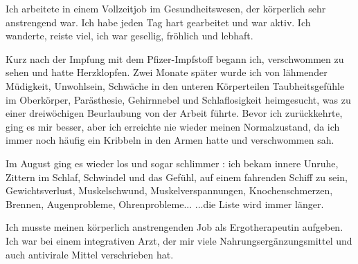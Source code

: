 Ich arbeitete in einem Vollzeitjob im Gesundheitswesen, der körperlich sehr
anstrengend war. Ich habe jeden Tag hart gearbeitet und war aktiv. Ich wanderte,
reiste viel, ich war gesellig, fröhlich und lebhaft.

Kurz nach der Impfung mit dem Pfizer-Impfstoff begann ich, verschwommen zu sehen
und hatte Herzklopfen. Zwei Monate später wurde ich von lähmender Müdigkeit,
Unwohlsein, Schwäche in den unteren Körperteilen Taubheitsgefühle im Oberkörper,
Parästhesie, Gehirnnebel und Schlaflosigkeit heimgesucht, was zu einer
dreiwöchigen Beurlaubung von der Arbeit führte. Bevor ich zurückkehrte, ging es
mir besser, aber ich erreichte nie wieder meinen Normalzustand, da ich immer
noch häufig ein Kribbeln in den Armen hatte und verschwommen sah.

Im August ging es wieder los und sogar schlimmer : ich bekam innere Unruhe,
Zittern im Schlaf, Schwindel und das Gefühl, auf einem fahrenden Schiff zu sein,
Gewichtsverlust, Muskelschwund, Muskelverspannungen, Knochenschmerzen, Brennen,
Augenprobleme, Ohrenprobleme... ...die Liste wird immer länger.

Ich musste meinen körperlich anstrengenden Job als Ergotherapeutin aufgeben. Ich
war bei einem integrativen Arzt, der mir viele Nahrungsergänzungsmittel und auch
antivirale Mittel verschrieben hat.
